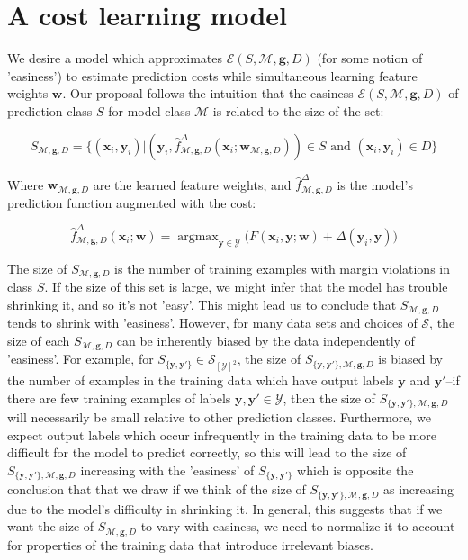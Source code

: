 \documentclass{article} %
\DeclareMathOperator*{\argmax}{argmax}
\begin{document}
\section{A cost learning model}
\label{costLearningModel}

We desire a model which approximates 
$\mathcal{E}(S,\mathcal{M},\mathbf{g}, D)$ (for some notion of 
'easiness') to estimate prediction costs while simultaneous learning 
feature weights $\mathbf{w}$.   Our proposal follows the intuition 
that the easiness 
$\mathcal{E}(S,\mathcal{M},\mathbf{g},D)$ of prediction class $S$ for 
model class $\mathcal{M}$ is related to the size of the set:

\begin{equation}
S_{\mathcal{M},\mathbf{g},D}=\{(\textbf{x}_i,\textbf{y}_i) | (\mathbf{y}_i,\hat{f}^\Delta_{\mathcal{M},\mathbf{g},D}(\mathbf{x}_i;\mathbf{w}_{\mathcal{M},\mathbf{g},D}))\in S\text{ and }(\mathbf{x}_i,\mathbf{y}_i)\in D\}
\end{equation}

Where $\mathbf{w}_{\mathcal{M},\mathbf{g},D}$ are the learned feature weights,
and $\hat{f}^\Delta_{\mathcal{M},\mathbf{g},D}$ is the model's prediction
function augmented with the cost:

\begin{equation}
\hat{f}^\Delta_{\mathcal{M},\mathbf{g},D}(\mathbf{x}_i;\mathbf{w})=\argmax_{\mathbf{y}\in\mathcal{Y}}\Big( F(\mathbf{x}_i,\mathbf{y};\mathbf{w})
+\Delta(\mathbf{y}_i,\mathbf{y})\Big)
\end{equation}

The size of $S_{\mathcal{M},\mathbf{g},D}$ is the number of
training examples with margin violations in class $S$. If
the size of this set is large, we might infer that the
model has trouble shrinking it, and so it's not 'easy'.  This 
might lead us to conclude that $S_{\mathcal{M},\mathbf{g},D}$ 
tends to shrink with 'easiness'.  However,
for many data sets and choices of $\mathcal{S}$, the size 
of each $S_{\mathcal{M},\mathbf{g},D}$ can be inherently
biased by the data independently of 'easiness'.  For example, 
for $S_{\{\mathbf{y},\mathbf{y}'\}}\in\mathcal{S}_{[\mathcal{Y}]^2}$, 
the size of $S_{\{\mathbf{y},\mathbf{y}'\},\mathcal{M},\mathbf{g},D}$ 
is biased by the number of examples in the training data which have 
output labels $\mathbf{y}$ and $\mathbf{y}'$--if there are few 
training examples of labels 
$\mathbf{y},\mathbf{y}'\in\mathcal{Y}$, then the size of 
$S_{\{\mathbf{y}, \mathbf{y}'\},\mathcal{M},\mathbf{g},D}$ 
will necessarily be small relative to other prediction classes.
Furthermore, we expect 
output labels which occur infrequently in the training data to 
be more difficult for the model to predict correctly, so this
will lead to the size of 
$S_{\{\mathbf{y},\mathbf{y}'\},\mathcal{M},\mathbf{g},D}$ 
increasing with the 'easiness' of 
$S_{\{\mathbf{y},\mathbf{y}'\}}$ which is opposite the 
conclusion that that we draw if we think of the size of 
$S_{\{\mathbf{y},\mathbf{y}'\},\mathcal{M},\mathbf{g},D}$ as
increasing due to the model's difficulty in shrinking it.  In general, 
this suggests that if we want the size of $S_{\mathcal{M},\mathbf{g},D}$
to vary with easiness, we need to normalize it to account for 
properties of the training data that introduce irrelevant
biases.  
\end{document}
